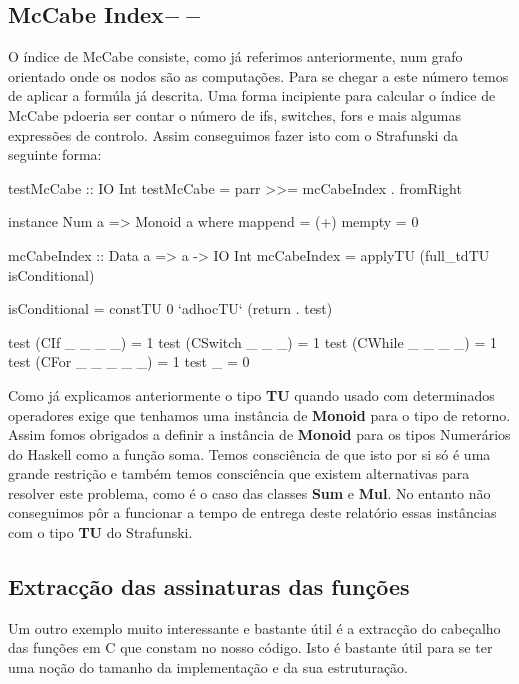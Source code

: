 \subsection{McCabe Index$--$}
O índice de McCabe consiste, como já referimos anteriormente, num grafo orientado onde os nodos são as computações. Para se chegar a este número
temos de aplicar a formúla já descrita. Uma forma incipiente para calcular o índice de McCabe pdoeria ser contar o número de ifs, switches, fors e mais algumas
expressões de controlo. Assim conseguimos fazer isto com o Strafunski da seguinte forma:
\begin{haskell}
testMcCabe :: IO Int 
testMcCabe =  parr >>= mcCabeIndex . fromRight

instance Num a => Monoid a where
    mappend = (+) 
    mempty = 0 
        
mcCabeIndex :: Data a => a -> IO Int 
mcCabeIndex =  applyTU (full_tdTU isConditional)
        
isConditional = constTU 0 `adhocTU` (return . test)

test (CIf _ _ _ _)    = 1
test (CSwitch _ _ _)  = 1
test (CWhile _ _ _ _) = 1
test (CFor _ _ _ _ _) = 1
test _                = 0
\end{haskell}
Como já explicamos anteriormente o tipo \textbf{TU} quando usado com determinados operadores exige que tenhamos uma instância de \textbf{Monoid} para o tipo de retorno.
Assim fomos obrigados a definir a instância de \textbf{Monoid} para os tipos Numerários do Haskell como a função soma. Temos consciência de que isto por si só
é uma grande restrição e também temos consciência que existem alternativas para resolver este problema, como é o caso das classes \textbf{Sum} e \textbf{Mul}.
No entanto não conseguimos pôr a funcionar a tempo de entrega deste relatório essas instâncias com o tipo \textbf{TU} do Strafunski.

\subsection{Extracção das assinaturas das funções}
Um outro exemplo muito interessante e bastante útil é a extracção do cabeçalho das funções em C que constam no nosso código. Isto é bastante útil para se ter uma noção
do tamanho da implementação e da sua estruturação.


